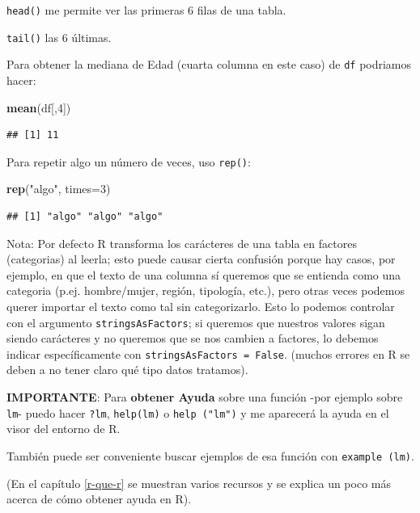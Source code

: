 \documentclass[]{book}
\newenvironment{Shaded}{\begin{snugshade}}{\end{snugshade}}
\newcommand{\DataTypeTok}[1]{\textcolor[rgb]{0.13,0.29,0.53}{#1}}
\newcommand{\DecValTok}[1]{\textcolor[rgb]{0.00,0.00,0.81}{#1}}
\newcommand{\KeywordTok}[1]{\textcolor[rgb]{0.13,0.29,0.53}{\textbf{#1}}}
\newcommand{\NormalTok}[1]{#1}
\newcommand{\StringTok}[1]{\textcolor[rgb]{0.31,0.60,0.02}{#1}}
\theoremstyle{definition}
\theoremstyle{definition}
\theoremstyle{definition}
\theoremstyle{remark}
\begin{document}
\texttt{head()} me permite ver las primeras 6 filas de una tabla.

\texttt{tail()} las 6 últimas.

Para obtener la mediana de Edad (cuarta columna en este caso) de
\texttt{df} podriamos hacer:

\begin{Shaded}
\begin{Highlighting}[]
\KeywordTok{mean}\NormalTok{(df[,}\DecValTok{4}\NormalTok{])}
\end{Highlighting}
\end{Shaded}

\begin{verbatim}
## [1] 11
\end{verbatim}

Para repetir algo un número de veces, uso \texttt{rep()}:

\begin{Shaded}
\begin{Highlighting}[]
\KeywordTok{rep}\NormalTok{(}\StringTok{"algo"}\NormalTok{, }\DataTypeTok{times=}\DecValTok{3}\NormalTok{)}
\end{Highlighting}
\end{Shaded}

\begin{verbatim}
## [1] "algo" "algo" "algo"
\end{verbatim}

Nota: Por defecto R transforma los carácteres de una tabla en factores
(categorias) al leerla; esto puede causar cierta confusión porque hay
casos, por ejemplo, en que el texto de una columna sí queremos que se
entienda como una categoria (p.ej. hombre/mujer, región, tipología,
etc.), pero otras veces podemos querer importar el texto como tal sin
categorizarlo. Esto lo podemos controlar con el argumento
\texttt{stringsAsFactors}; si queremos que nuestros valores sigan siendo
carácteres y no queremos que se nos cambien a factores, lo debemos
indicar específicamente con \texttt{stringsAsFactors\ =\ False}. (muchos
errores en R se deben a no tener claro qué tipo datos tratamos).

 \textbf{IMPORTANTE}: Para \textbf{obtener Ayuda} sobre una función -por
ejemplo sobre \texttt{lm}- puedo hacer \texttt{?lm}, \texttt{help(lm)} o
\texttt{help\ ("lm")} y me aparecerá la ayuda en el visor del entorno de
R.

También puede ser conveniente buscar ejemplos de esa función con
\texttt{example\ (lm)}.

(En el capítulo \ref{r-que-r} se muestran varios recursos y se explica
un poco más acerca de cómo obtener ayuda en R).
\end{document}
